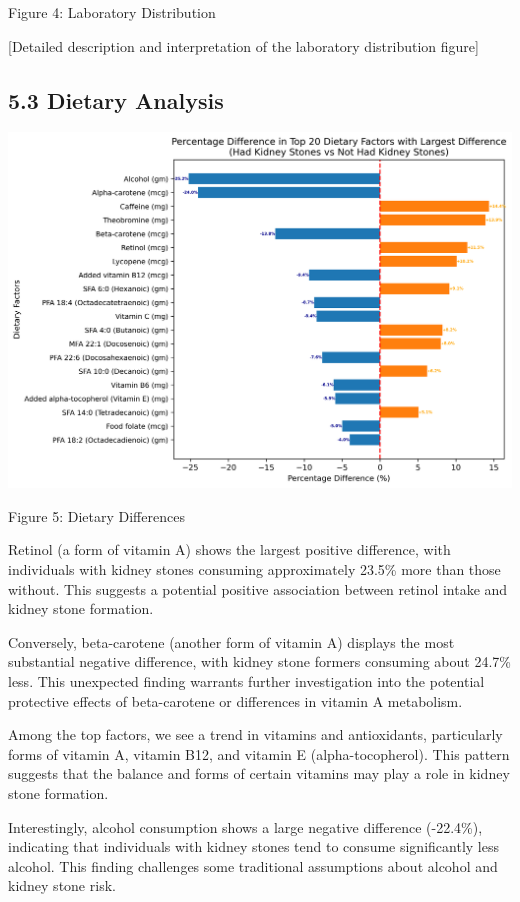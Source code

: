 \documentclass[
]{article}
\begin{document}
Figure 4: Laboratory Distribution

{[}Detailed description and interpretation of the laboratory
distribution figure{]}

\hypertarget{dietary-analysis}{%
\subsection{5.3 Dietary Analysis}\label{dietary-analysis}}

\includegraphics{../figures/dietary_difference.png}

Figure 5: Dietary Differences

Retinol (a form of vitamin A) shows the largest positive difference,
with individuals with kidney stones consuming approximately 23.5\% more
than those without. This suggests a potential positive association
between retinol intake and kidney stone formation.

Conversely, beta-carotene (another form of vitamin A) displays the most
substantial negative difference, with kidney stone formers consuming
about 24.7\% less. This unexpected finding warrants further
investigation into the potential protective effects of beta-carotene or
differences in vitamin A metabolism.

Among the top factors, we see a trend in vitamins and antioxidants,
particularly forms of vitamin A, vitamin B12, and vitamin E
(alpha-tocopherol). This pattern suggests that the balance and forms of
certain vitamins may play a role in kidney stone formation.

Interestingly, alcohol consumption shows a large negative difference
(-22.4\%), indicating that individuals with kidney stones tend to
consume significantly less alcohol. This finding challenges some
traditional assumptions about alcohol and kidney stone risk.
\end{document}
